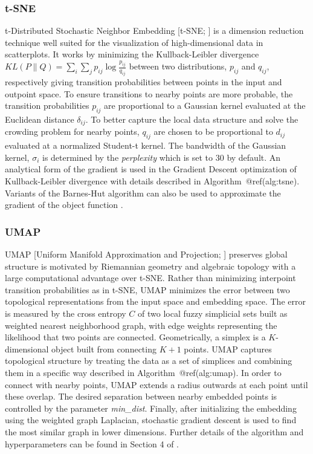 \documentclass{article}
\begin{document}
\hypertarget{t-sne}{%
\subsubsection*{t-SNE}\label{t-sne}}

t-Distributed Stochastic Neighbor Embedding {[}t-SNE;
\citet{Van_der_Maaten2008-dv}{]} is a dimension reduction technique well
suited for the visualization of high-dimensional data in scatterplots.
It works by minimizing the Kullback-Leibler divergence
\(K L(P \| Q)=\sum_{i} \sum_{j} p_{ij} \log \frac{p_{ij}}{q_{ij}}\)
between two distributions, \(p_{ij}\) and \(q_{ij}\), respectively
giving transition probabilities between points in the input and outpoint
space. To ensure transitions to nearby points are more probable, the
transition probabilities \(p_{ij}\) are proportional to a Gaussian
kernel evaluated at the Euclidean distance \(\delta_{ij}\). To better
capture the local data structure and solve the crowding
problem\citep{Van_der_Maaten2008-dv} for nearby points, \(q_{ij}\) are
chosen to be proportional to \(d_{ij}\) evaluated at a normalized
Student-t kernel. The bandwidth of the Gaussian kernel, \(\sigma_i\) is
determined by the \emph{perplexity} which is set to 30 by default. An
analytical form of the gradient is used in the Gradient Descent
optimization of Kullback-Leibler divergence with details described in
Algorithm~@ref(alg:tsne). Variants of the Barnes-Hut algorithm can also
be used to approximate the gradient of the object function
\citep{Van_Der_Maaten2014-in}.

\hypertarget{umap}{%
\subsubsection*{UMAP}\label{umap}}

UMAP {[}Uniform Manifold Approximation and Projection;
\citet{McInnes2018-xo}{]} preserves global structure is motivated by
Riemannian geometry and algebraic topology with a large computational
advantage over t-SNE. Rather than minimizing interpoint transition
probabilities as in t-SNE, UMAP minimizes the error between two
topological representations from the input space and embedding space.
The error is measured by the cross entropy \(C\) of two local fuzzy
simplicial sets built as weighted nearest neighborhood graph, with edge
weights representing the likelihood that two points are connected.
Geometrically, a simplex is a \(K\)-dimensional object built from
connecting \(K+1\) points. UMAP captures topological structure by
treating the data as a set of simplices and combining them in a specific
way described in Algorithm~@ref(alg:umap). In order to connect with
nearby points, UMAP extends a radius outwards at each point until these
overlap. The desired separation between nearby embedded points is
controlled by the parameter \textit{min\_dist}. Finally, after
initializing the embedding using the weighted graph Laplacian,
stochastic gradient descent is used to find the most similar graph in
lower dimensions. Further details of the algorithm and hyperparameters
can be found in Section 4 of \citet{McInnes2018-xo}.
\end{document}
